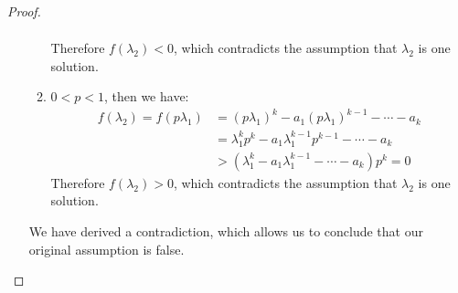 \documentclass[12pt,a4]{article}
\begin{document}
\begin{proof}
\begin{enumerate}
\begin{enumerate}
\begin{align*}
      \end{align*}
      Therefore $f(\lambda_2) < 0$, which contradicts the assumption that $\lambda_2$ is one solution.
      \item $0 < p < 1$, then we have:
      \begin{align*}
      f(\lambda_2) = f(p\lambda_1) &= (p\lambda_1)^k - a_1(p\lambda_1)^{k-1} - \cdots - a_k \\
      &= \lambda_1^k p^k - a_1 \lambda_1^{k-1} p^{k-1} - \cdots - a_k \\
      &> (\lambda_1^k - a_1 \lambda_1^{k-1} - \cdots - a_k) p^k = 0
      \end{align*} 
      Therefore $f(\lambda_2) > 0$, which contradicts the assumption that $\lambda_2$ is one solution.
    \end{enumerate}
    We have derived a contradiction, which allows us to conclude that our original assumption is false.
  \end{enumerate}
\end{proof}
\end{document}
